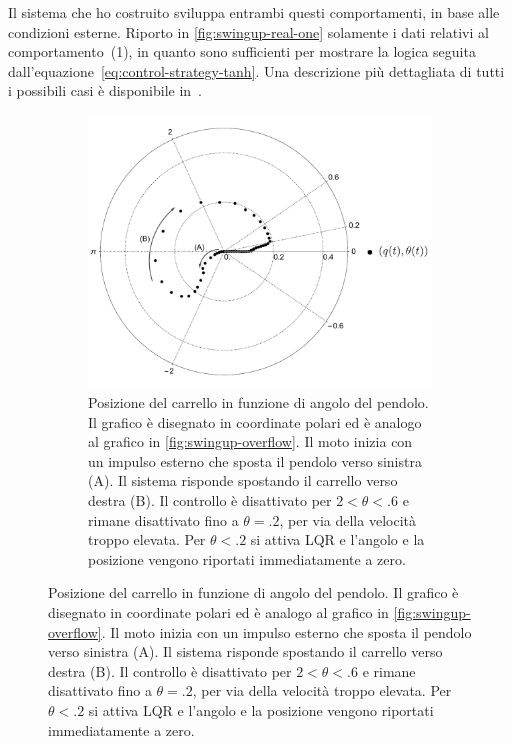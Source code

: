 Il sistema che ho costruito sviluppa entrambi questi comportamenti,
in base alle condizioni esterne\footnotemark .
Riporto in \autoref{fig:swingup-real-one} solamente i dati relativi al comportamento~(1), in quanto sono
sufficienti per mostrare la logica seguita dall'equazione~\eqref{eq:control-strategy-tanh}.
Una descrizione più dettagliata di tutti i possibili casi è disponibile in~\cite{furutaSwingup}.


\begin{figure}
    \centering
    \begin{subfigure}[]{\textwidth}
        \centering
        \includegraphics[width=.6\textwidth]{assets/polar-swingup-real}
        \caption{Posizione del carrello in funzione di angolo del pendolo.
        Il grafico è disegnato in coordinate polari ed è analogo
        al grafico in \autoref{fig:swingup-overflow}.
        Il moto inizia con un impulso esterno che sposta il pendolo
        verso sinistra (A). Il sistema risponde spostando il carrello verso
        destra (B). Il controllo è disattivato per $2 < \theta < .6$
        e rimane disattivato fino a $\theta = .2$, per via della velocità troppo
        elevata. Per $\theta < .2$ si attiva LQR e l'angolo e la posizione
        vengono riportati immediatamente a zero.
        }
        \label{fig:spazio-fasi-sistema-polare}
    \end{subfigure}


\end{figure}
